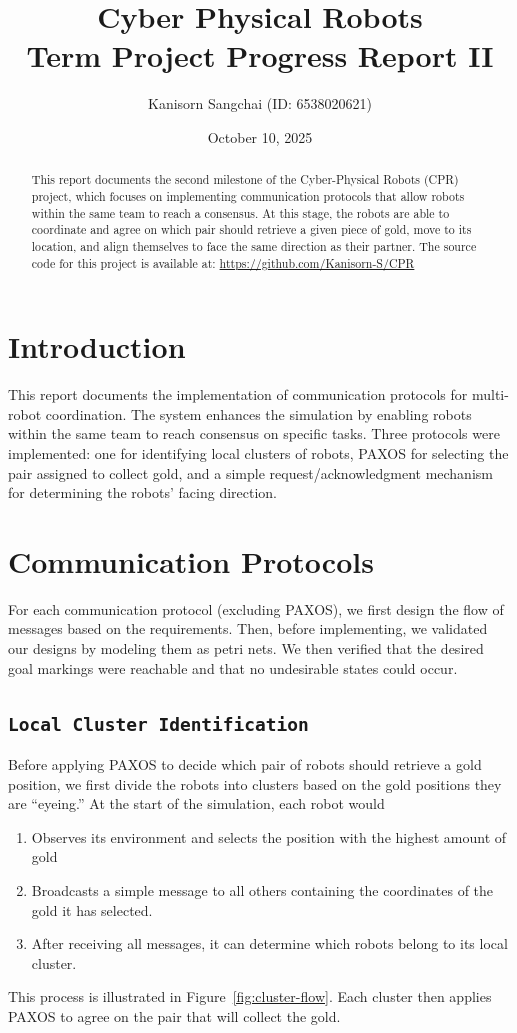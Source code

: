 \documentclass[12pt,a4paper]{article}
\title{Cyber Physical Robots\\Term Project Progress Report II}
\author{Kanisorn Sangchai (ID: 6538020621)}
\date{October 10, 2025}
\begin{document}
\maketitle

\begin{abstract}
This report documents the second milestone of the Cyber-Physical Robots (CPR) project, which focuses on implementing communication protocols that allow robots within the same team to reach a consensus. At this stage, the robots are able to coordinate and agree on which pair should retrieve a given piece of gold, move to its location, and align themselves to face the same direction as their partner. The source code for this project is available at: \url{https://github.com/Kanisorn-S/CPR}
\end{abstract}

\section{Introduction}
This report documents the implementation of communication protocols for multi-robot coordination. The system enhances the simulation by enabling robots within the same team to reach consensus on specific tasks. Three protocols were implemented: one for identifying local clusters of robots, PAXOS for selecting the pair assigned to collect gold, and a simple request/acknowledgment mechanism for determining the robots’ facing direction.

\section{Communication Protocols}
For each communication protocol (excluding PAXOS), we first design the flow of messages based on the requirements. Then, before implementing, we validated our designs by modeling them as petri nets. We then verified that the desired goal markings were reachable and that no undesirable states could occur.

\subsection{\texttt{Local Cluster Identification}}
Before applying PAXOS to decide which pair of robots should retrieve a gold position, we first divide the robots into clusters based on the gold positions they are “eyeing.” At the start of the simulation, each robot would
\begin{enumerate}
    \item Observes its environment and selects the position with the highest amount of gold
    \item Broadcasts a simple message to all others containing the coordinates of the gold it has selected.
    \item After receiving all messages, it can determine which robots belong to its local cluster.
\end{enumerate}
This process is illustrated in Figure~\ref{fig:cluster-flow}.
Each cluster then applies PAXOS to agree on the pair that will collect the gold.
\end{document}
